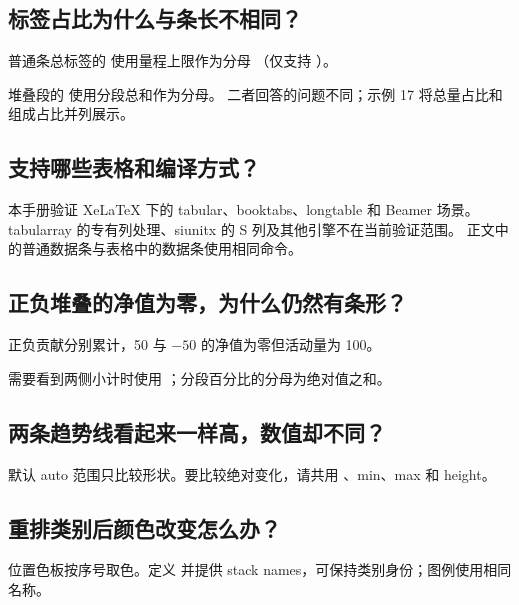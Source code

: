 \subsection{标签占比为什么与条长不相同？}
普通条总标签的  使用量程上限作为分母
（仅支持 ）。\par
堆叠段的  使用分段总和作为分母。
二者回答的问题不同；示例 17 将总量占比和组成占比并列展示。

\subsection{支持哪些表格和编译方式？}
本手册验证 XeLaTeX 下的 tabular、booktabs、longtable 和 Beamer 场景。
tabularray 的专有列处理、siunitx 的 S 列及其他引擎不在当前验证范围。
正文中的普通数据条与表格中的数据条使用相同命令。



\subsection{正负堆叠的净值为零，为什么仍然有条形？}
正负贡献分别累计，50 与 $-50$ 的净值为零但活动量为 100。

需要看到两侧小计时使用 ；分段百分比的分母为绝对值之和。
\subsection{两条趋势线看起来一样高，数值却不同？}
默认 auto 范围只比较形状。要比较绝对变化，请共用 、min、max 和 height。
\subsection{重排类别后颜色改变怎么办？}
位置色板按序号取色。定义  并提供 stack names，可保持类别身份；图例使用相同名称。
